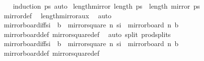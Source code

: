 \begin{isabellebody}
%
\isadelimproof
\ \ %
\endisadelimproof
%
\isatagproof
{}\isamarkupfalse%
\ {\isacharparenleft}{\kern0pt}induction\ ps{\isacharparenright}{\kern0pt}\ auto%
\endisatagproof
{\isafoldproof}%
%
\isadelimproof
\isanewline
%
\endisadelimproof
\isanewline
{}\isamarkupfalse%
\ length{\isacharunderscore}{\kern0pt}mirror{}{\isacharcolon}{\kern0pt}\ {\isachardoublequoteopen}length\ ps\ {\isacharequal}{\kern0pt}\ length\ {\isacharparenleft}{\kern0pt}mirror{}\ ps{\isacharparenright}{\kern0pt}{\isachardoublequoteclose}\isanewline
%
\isadelimproof
\ \ %
\endisadelimproof
%
\isatagproof
{}\isamarkupfalse%
\ mirror{}{\isacharunderscore}{\kern0pt}def\ \isamarkupfalse%
\ length{\isacharunderscore}{\kern0pt}mirror{}{\isacharunderscore}{\kern0pt}aux\ \isamarkupfalse%
\ auto%
\endisatagproof
{\isafoldproof}%
%
\isadelimproof
\isanewline
%
\endisadelimproof
\isanewline
{}\isamarkupfalse%
\ mirror{}{\isacharunderscore}{\kern0pt}board{\isacharunderscore}{\kern0pt}iff{\isacharcolon}{\kern0pt}{\isachardoublequoteopen}s\isactrlsub i\ {\isasymnotin}\ b\ {\isasymlongleftrightarrow}\ mirror{}{\isacharunderscore}{\kern0pt}square\ n\ s\isactrlsub i\ {\isasymnotin}\ mirror{}{\isacharunderscore}{\kern0pt}board\ n\ b{\isachardoublequoteclose}\isanewline
%
\isadelimproof
\ \ %
\endisadelimproof
%
\isatagproof
{}\isamarkupfalse%
\ mirror{}{\isacharunderscore}{\kern0pt}board{\isacharunderscore}{\kern0pt}def\ mirror{}{\isacharunderscore}{\kern0pt}square{\isacharunderscore}{\kern0pt}def\ \isamarkupfalse%
\ {\isacharparenleft}{\kern0pt}auto\ split{\isacharcolon}{\kern0pt}\ prod{\isachardot}{\kern0pt}splits{\isacharparenright}{\kern0pt}%
\endisatagproof
{\isafoldproof}%
%
\isadelimproof
\isanewline
%
\endisadelimproof
\isanewline
{}\isamarkupfalse%
\ mirror{}{\isacharunderscore}{\kern0pt}board{\isacharunderscore}{\kern0pt}iff{\isacharcolon}{\kern0pt}{\isachardoublequoteopen}s\isactrlsub i\ {\isasymnotin}\ b\ {\isasymlongleftrightarrow}\ mirror{}{\isacharunderscore}{\kern0pt}square\ n\ s\isactrlsub i\ {\isasymnotin}\ mirror{}{\isacharunderscore}{\kern0pt}board\ n\ b{\isachardoublequoteclose}\isanewline
%
\isadelimproof
\ \ %
\endisadelimproof
%
\isatagproof
{}\isamarkupfalse%
\ mirror{}{\isacharunderscore}{\kern0pt}board{\isacharunderscore}{\kern0pt}def\ mirror{}{\isacharunderscore}{\kern0pt}square{\isacharunderscore}{\kern0pt}def\ \isamarkupfalse%

\end{isabellebody}
